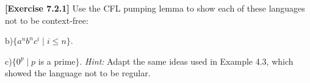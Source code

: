 \textbf{[Exercise 7.2.1]} Use the CFL pumping lemma to show each of 
these languages not to be context-free:

b)$\{a^nb^nc^i\mid i\le n\}$.

c)$\{0^p\mid p$ is a prime$\}$. \textit{Hint:} Adapt the same
ideas used in Example 4.3, which showed the language not to be regular.